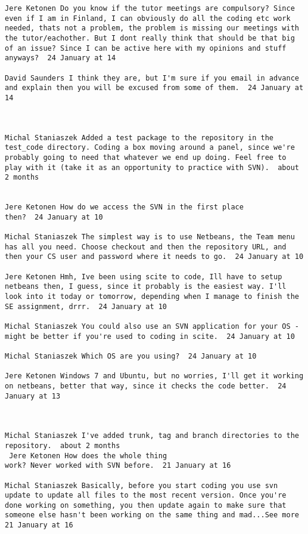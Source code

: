 \documentclass[10pt]{report}
\begin{document}
\begin{verbatim}
Jere Ketonen Do you know if the tutor meetings are compulsory? Since
even if I am in Finland, I can obviously do all the coding etc work
needed, thats not a problem, the problem is missing our meetings with
the tutor/eachother. But I dont really think that should be that big
of an issue? Since I can be active here with my opinions and stuff
anyways?  24 January at 14

David Saunders I think they are, but I'm sure if you email in advance
and explain then you will be excused from some of them.  24 January at
14



Michal Staniaszek Added a test package to the repository in the
test_code directory. Coding a box moving around a panel, since we're
probably going to need that whatever we end up doing. Feel free to
play with it (take it as an opportunity to practice with SVN).  about
2 months 
 

Jere Ketonen How do we access the SVN in the first place
then?  24 January at 10

Michal Staniaszek The simplest way is to use Netbeans, the Team menu
has all you need. Choose checkout and then the repository URL, and
then your CS user and password where it needs to go.  24 January at 10

Jere Ketonen Hmh, Ive been using scite to code, Ill have to setup
netbeans then, I guess, since it probably is the easiest way. I'll
look into it today or tomorrow, depending when I manage to finish the
SE assignment, drrr.  24 January at 10

Michal Staniaszek You could also use an SVN application for your OS -
might be better if you're used to coding in scite.  24 January at 10

Michal Staniaszek Which OS are you using?  24 January at 10

Jere Ketonen Windows 7 and Ubuntu, but no worries, I'll get it working
on netbeans, better that way, since it checks the code better.  24
January at 13



Michal Staniaszek I've added trunk, tag and branch directories to the
repository.  about 2 months 
 Jere Ketonen How does the whole thing
work? Never worked with SVN before.  21 January at 16

Michal Staniaszek Basically, before you start coding you use svn
update to update all files to the most recent version. Once you're
done working on something, you then update again to make sure that
someone else hasn't been working on the same thing and mad...See more
21 January at 16




\end{verbatim}
\end{document}
